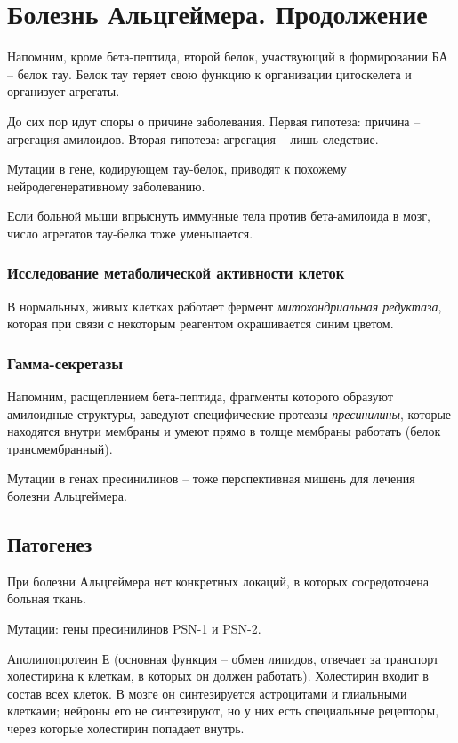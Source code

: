 \documentclass[main.tex]{subfiles}
\begin{document}
	
\section{Болезнь Альцгеймера. Продолжение}
Напомним, кроме бета-пептида, второй белок, участвующий в формировании БА -- белок тау.
Белок тау теряет свою функцию к организации цитоскелета и организует агрегаты.

До сих пор идут споры о причине заболевания.
Первая гипотеза: причина -- агрегация амилоидов.
Вторая гипотеза: агрегация -- лишь следствие.

Мутации в гене, кодирующем тау-белок, приводят к похожему нейродегенеративному заболеванию.

Если больной мыши впрыснуть иммунные тела против бета-амилоида в мозг, число агрегатов тау-белка тоже уменьшается.

\subsubsection{Исследование метаболической активности клеток}

В нормальных, живых клетках работает фермент \emph{митохондриальная редуктаза}, которая при связи с некоторым реагентом окрашивается синим цветом.

\subsubsection{ Гамма-секретазы }

Напомним, расщеплением бета-пептида, фрагменты которого образуют амилоидные структуры, заведуют специфические протеазы \emph{пресинилины}, которые находятся внутри мембраны и умеют прямо в толще мембраны работать (белок трансмембранный).

Мутации в генах пресинилинов -- тоже перспективная мишень для лечения болезни Альцгеймера.


\subsection{ Патогенез }

При болезни Альцгеймера нет конкретных локаций, в которых сосредоточена больная ткань.

Мутации: гены пресинилинов PSN-1 и PSN-2.

Аполипопротеин Е (основная функция -- обмен липидов, отвечает за транспорт холестирина к клеткам, в которых он должен работать).
Холестирин входит в состав всех клеток.
В мозге он синтезируется астроцитами и глиальными клетками; нейроны его не синтезируют, но у них есть специальные рецепторы, через которые холестирин попадает внутрь.
\end{document}
